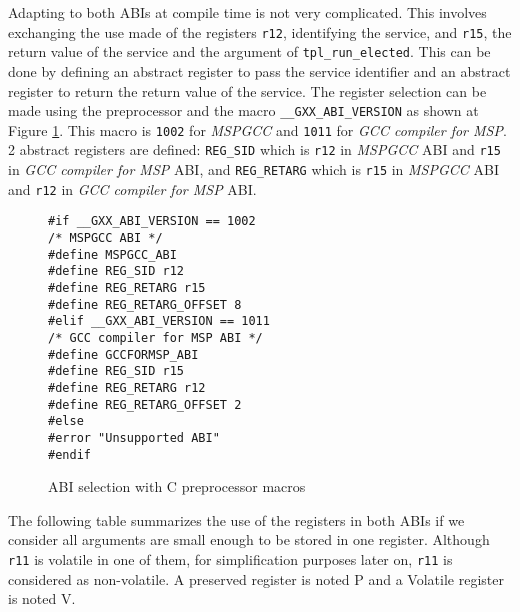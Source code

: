 \documentclass[11pt, oneside]{article}   	%
\begin{document}
Adapting to both ABIs at compile time is not very complicated. This involves exchanging the use made of the registers \lstinline{r12}, identifying the service, and \lstinline{r15}, the return value of the service and the argument of \lstinline{tpl_run_elected}. This can be done by defining an abstract register to pass the service identifier and an abstract register to return the return value of the service. The register selection can be made using the preprocessor and the macro \lstinline{__GXX_ABI_VERSION} as shown at Figure \ref{lst:macroabi}. This macro is \lstinline{1002} for \emph{MSPGCC} and \lstinline{1011} for \emph{GCC compiler for MSP}. 2 abstract registers are defined: \lstinline{REG_SID} which is \lstinline{r12} in \emph{MSPGCC} ABI and \lstinline{r15} in \emph{GCC compiler for MSP} ABI, and \lstinline{REG_RETARG} which is \lstinline{r15} in \emph{MSPGCC} ABI and \lstinline{r12}  in \emph{GCC compiler for MSP} ABI.

\begin{figure}[h]
\caption{ABI selection with C preprocessor macros}
\begin{lstlisting}
#if __GXX_ABI_VERSION == 1002
/* MSPGCC ABI */
#define MSPGCC_ABI
#define REG_SID r12
#define REG_RETARG r15
#define REG_RETARG_OFFSET 8
#elif __GXX_ABI_VERSION == 1011
/* GCC compiler for MSP ABI */
#define GCCFORMSP_ABI
#define REG_SID r15
#define REG_RETARG r12
#define REG_RETARG_OFFSET 2
#else
#error "Unsupported ABI"
#endif
\end{lstlisting}
\label{lst:macroabi}
\end{figure}

The following table summarizes the use of the registers in both ABIs if we consider all arguments are small enough to be stored in one register. Although \lstinline{r11} is volatile in one of them, for simplification purposes later on, \lstinline{r11} is considered as non-volatile. A preserved register is noted P and a Volatile register is noted V.
\end{document}
